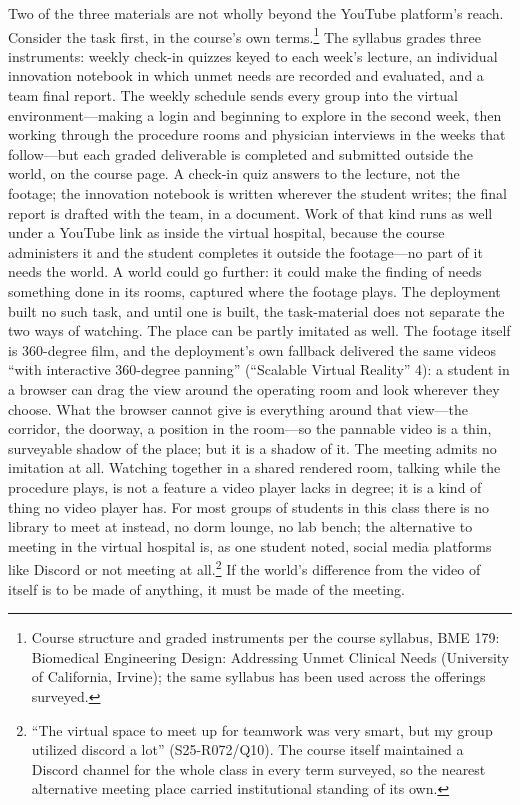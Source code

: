 Two of the three materials are not wholly beyond the YouTube
platform's reach. Consider the task first, in the course's own
terms.\footnote{Course structure and graded instruments per the course
syllabus, BME 179: Biomedical Engineering Design: Addressing Unmet
Clinical Needs (University of California, Irvine); the same syllabus
has been used across the offerings surveyed.} The syllabus grades
three instruments: weekly check-in quizzes keyed to each week's
lecture, an individual innovation notebook in which unmet needs are
recorded and evaluated, and a team final report. The weekly schedule
sends every group into the virtual environment---making a login and
beginning to explore in the second week, then working through the
procedure rooms and physician interviews in the weeks that
follow---but each graded deliverable is completed and submitted
outside the world, on the course page. A check-in quiz answers to the
lecture, not the footage; the innovation notebook is written wherever
the student writes; the final report is drafted with the team, in a
document. Work of that kind runs as well under a YouTube link as
inside the virtual hospital, because the course administers it and the
student completes it outside the footage---no part of it needs the
world. A world could go further: it could make
the finding of needs something done in its rooms, captured where the
footage plays. The deployment built no such task, and until one is
built, the task-material does not separate the two ways of watching.
The place can be partly imitated as well. The footage itself is
360-degree film, and the deployment's own fallback delivered the same
videos ``with interactive 360-degree panning'' (``Scalable Virtual
Reality'' 4): a student in a browser can drag the view around the
operating room and look wherever they choose. What the browser cannot
give is everything around that view---the corridor, the doorway, a
position in the room---so the pannable video is a thin, surveyable
shadow of the place; but it is a shadow of it. The meeting admits no
imitation at all. Watching together in a shared rendered room,
talking while the procedure plays, is not a feature a video player
lacks in degree; it is a kind of thing no video player has. For most
groups of students in this class there is no library to meet at
instead, no dorm lounge, no lab bench; the alternative to meeting in
the virtual hospital is, as one student noted, social media platforms
like Discord or not meeting at all.\footnote{``The virtual space to
meet up for teamwork was very smart, but my group utilized discord a
lot'' (S25-R072/Q10). The course itself maintained a Discord channel
for the whole class in every term surveyed, so the nearest alternative
meeting place carried institutional standing of its own.} If the world's difference from the video of itself is to be
made of anything, it must be made of the meeting.

